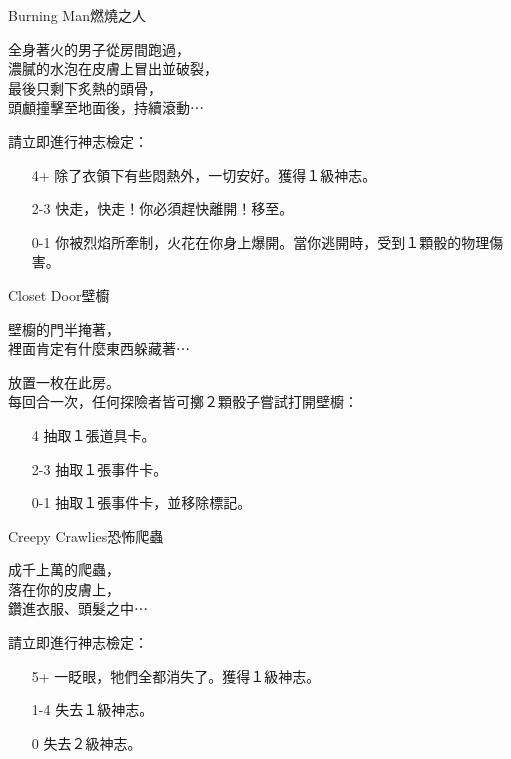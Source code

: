 %
\begin{EventCard}{Burning Man}{燃燒之人}

  \begin{CardStory}
    全身著火的男子從房間跑過，\\
    濃膩的水泡在皮膚上冒出並破裂，\\
    最後只剩下炙熱的頭骨，\\
    頭顱撞擊至地面後，持續滾動⋯
  \end{CardStory}

  請立即進行神志檢定：
  \begin{itemize}
    \item[4+] 除了衣領下有些悶熱外，一切安好。獲得１級神志。
    \item[2-3] 快走，快走！你必須趕快離開！移至。
    \item[0-1] 你被烈焰所牽制，火花在你身上爆開。當你逃開時，受到１顆骰的物理傷害。
  \end{itemize}

\end{EventCard}%
%
\begin{EventCard}{Closet Door}{壁櫥}

  \begin{CardStory}
    壁櫥的門半掩著，\\
    裡面肯定有什麼東西躲藏著⋯
  \end{CardStory}

  放置一枚在此房。\\[0.5em]
  每回合一次，任何探險者皆可擲２顆骰子嘗試打開壁櫥：
  \begin{itemize}
    \item[4] 抽取１張道具卡。
    \item[2-3] 抽取１張事件卡。
    \item[0-1] 抽取１張事件卡，並移除標記。
  \end{itemize}

\end{EventCard}%
%
\begin{EventCard}{Creepy Crawlies}{恐怖爬蟲}

  \begin{CardStory}
    成千上萬的爬蟲，\\
    落在你的皮膚上，\\
    鑽進衣服、頭髮之中⋯
  \end{CardStory}

  請立即進行神志檢定：
  \begin{itemize}
    \item[5+] 一眨眼，牠們全都消失了。獲得１級神志。
    \item[1-4] 失去１級神志。
    \item[0] 失去２級神志。
  \end{itemize}

\end{EventCard}%

